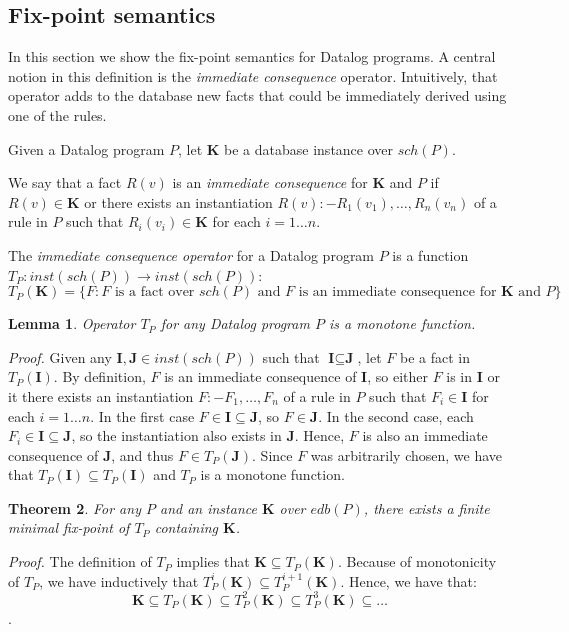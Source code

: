 \documentclass{pracamgr}
\theoremstyle{plain}
\newtheorem{thm}{Theorem}[section]
\newtheorem{lem}[thm]{Lemma}
\theoremstyle{definition}
\theoremstyle{remark}
\newcommand{\assign}{:-}
\begin{document}
\subsection{Fix-point semantics}
In this section we show the fix-point semantics for Datalog programs. A central notion in this definition is the \emph{immediate consequence} operator. Intuitively, that operator adds to the database new facts that could be immediately derived using one of the rules.

Given a Datalog program $P$, let $\textbf{K}$ be a database instance over $sch(P)$.

We say that a fact $R(v)$ is an \emph{immediate consequence} for $\textbf{K}$ and $P$ if $R(v) \in \textbf{K}$ or there exists an instantiation $R(v) \assign R_1(v_1), \dots, R_n(v_n)$ of a rule in $P$ such that $R_i(v_i) \in \textbf{K}$ for each $i = 1\dots n$.

The \emph{immediate consequence operator} for a Datalog program $P$ is a function $T_P: inst(sch(P)) \to inst(sch(P))$:
$$T_P(\textbf{K}) = \{ F: F \text{ is a fact over } sch(P) \text{ and $F$ is an immediate consequence for } \textbf{K} \text{ and } P \}$$

\begin{lem}
Operator $T_P$ for any Datalog program $P$ is a monotone function.
\end{lem}
\emph{Proof.} Given any $\textbf{I}, \textbf{J} \in inst(sch(P))$ such that $\textbf{I} \subseteq \textbf{J}$, let $F$ be a fact in $T_P(\textbf{I})$.
By definition, $F$ is an immediate consequence of $\textbf{I}$, so either $F$ is in $\textbf{I}$ or it there exists an instantiation
 $F \assign F_1, \dots, F_n$ of a rule in $P$ such that $F_i \in \textbf{I}$ for each $i = 1\dots n$. 
In the first case $F \in \textbf{I} \subseteq \textbf{J}$, so $F \in \textbf{J}$. 
In the second case, each $F_i \in \textbf{I} \subseteq \textbf{J}$, so the instantiation also exists in $\textbf{J}$. 
Hence, $F$ is also an immediate consequence of $\textbf{J}$, and thus $F \in T_P(\textbf{J})$. 
Since $F$ was arbitrarily chosen, we have that $T_P(\textbf{I}) \subseteq T_P(\textbf{I})$ and $T_P$ is a monotone function.

\begin{thm}
For any $P$ and an instance $\textbf{K}$ over $edb(P)$, there exists a finite minimal fix-point of $T_P$ containing $\textbf{K}$.
\end{thm}\label{t:datalogfixpointsem}
\emph{Proof.}
The definition of $T_P$ implies that $\textbf{K} \subseteq T_P(\textbf{K})$.
Because of monotonicity of $T_P$, we have inductively that $T_P^i(\textbf{K}) \subseteq T_P^{i+1}(\textbf{K})$.
Hence, we have that:
$$\textbf{K} \subseteq T_P(\textbf{K}) \subseteq T_P^2(\textbf{K}) \subseteq T_P^3(\textbf{K}) \subseteq \dots$$.
\end{document}
